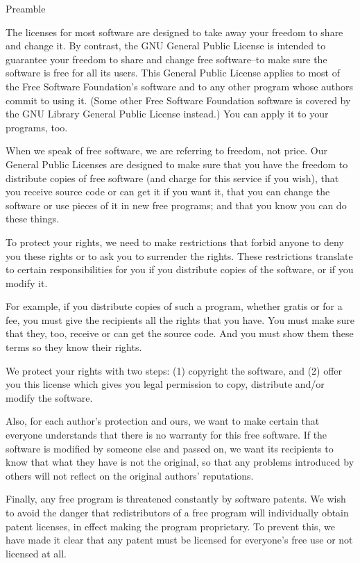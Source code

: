 \documentclass{doc}
\begin{document}
			    Preamble

  The licenses for most software are designed to take away your
freedom to share and change it.  By contrast, the GNU General Public
License is intended to guarantee your freedom to share and change free
software--to make sure the software is free for all its users.  This
General Public License applies to most of the Free Software
Foundation's software and to any other program whose authors commit to
using it.  (Some other Free Software Foundation software is covered by
the GNU Library General Public License instead.)  You can apply it to
your programs, too.

  When we speak of free software, we are referring to freedom, not
price.  Our General Public Licenses are designed to make sure that you
have the freedom to distribute copies of free software (and charge for
this service if you wish), that you receive source code or can get it
if you want it, that you can change the software or use pieces of it
in new free programs; and that you know you can do these things.

  To protect your rights, we need to make restrictions that forbid
anyone to deny you these rights or to ask you to surrender the rights.
These restrictions translate to certain responsibilities for you if you
distribute copies of the software, or if you modify it.

  For example, if you distribute copies of such a program, whether
gratis or for a fee, you must give the recipients all the rights that
you have.  You must make sure that they, too, receive or can get the
source code.  And you must show them these terms so they know their
rights.

  We protect your rights with two steps: (1) copyright the software, and
(2) offer you this license which gives you legal permission to copy,
distribute and/or modify the software.

  Also, for each author's protection and ours, we want to make certain
that everyone understands that there is no warranty for this free
software.  If the software is modified by someone else and passed on, we
want its recipients to know that what they have is not the original, so
that any problems introduced by others will not reflect on the original
authors' reputations.

  Finally, any free program is threatened constantly by software
patents.  We wish to avoid the danger that redistributors of a free
program will individually obtain patent licenses, in effect making the
program proprietary.  To prevent this, we have made it clear that any
patent must be licensed for everyone's free use or not licensed at all.
\end{document}
